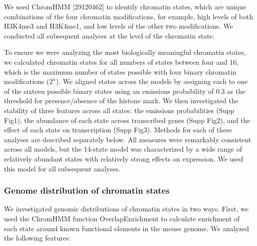 \documentclass[10pt,letterpaper]{article}
\begin{document}
We used ChromHMM {[}29120462{]} to identify chromatin states, which are
unique combinations of the four chromatin modifications, for example,
high levels of both H3K4me3 and H3K4me1, and low levels of the other two
modifications. We conducted all subsequent analyses at the level of the
chromatin state.

To ensure we were analyzing the most biologically meaningful chromatin
states, we calculated chromatin states for all numbers of states between
four and 16, which is the maximum number of states possible with four
binary chromatin modifications (\(2^n\)). We aligned states across the
models by assigning each to one of the sixteen possible binary states
using an emissions probability of 0.3 as the threshold for
presence/absence of the histone mark. We then investigated the stability
of three features across all states: the emissions probabilities (Supp
Fig1), the abundance of each state across transcribed genes (Supp Fig2),
and the effect of each state on transcription (Supp Fig3). Methods for
each of these analyses are described separately below. All measures were
remarkably consistent across all models, but the 14-state model was
characterized by a wide range of relatively abundant states with
relatively strong effects on expression. We used this model for all
subsequent analyses.

\hypertarget{genome-distribution-of-chromatin-states}{%
\subsubsection{Genome distribution of chromatin
states}\label{genome-distribution-of-chromatin-states}}

We investigated genomic distributions of chromatin states in two ways.
First, we used the ChromHMM function OverlapEnrichment to calculate
enrichment of each state around known functional elements in the mouse
genome. We analyzed the following features:
\end{document}
